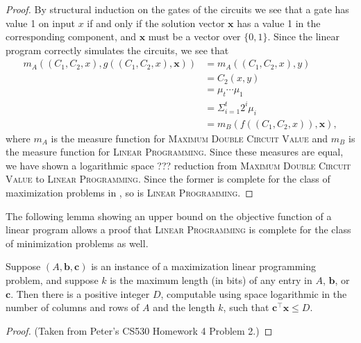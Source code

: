 \documentclass[]{article}
\begin{document}
\begin{proof}
  By structural induction on the gates of the circuits we see that a gate has value 1 on input $x$ if and only if the solution vector $\mathbf{x}$ has a value 1 in the corresponding component, and $\mathbf{x}$ must be a vector over $\{0, 1\}$.
  Since the linear program correctly simulates the circuits, we see that
  \begin{align*}
    m_A((C_1, C_2, x), g((C_1, C_2, x), \mathbf{x})) & = m_A((C_1, C_2, x), y) \\
    & = C_2(x, y) \\
    & = \mu_t \dotsb \mu_1 \\
    & = \Sigma^t_{i = 1} 2^i \mu_i \\
    & = m_B(f((C_1, C_2, x)), \mathbf{x}),
  \end{align*}
  where $m_A$ is the measure function for \textsc{Maximum Double Circuit Value} and $m_B$ is the measure function for \textsc{Linear Programming}.
  Since these measures are equal, we have shown a logarithmic space ??? reduction from \textsc{Maximum Double Circuit Value} to \textsc{Linear Programming}.
  Since the former is complete for the class of maximization problems in \PO, so is \textsc{Linear Programming}.
\end{proof}

The following lemma showing an upper bound on the objective function of a linear program allows a proof that \textsc{Linear Programming} is complete for the class of minimization problems as well.

\begin{lemma}\label{lem:upperbound}
  Suppose $(A, \mathbf{b}, \mathbf{c})$ is an instance of a maximization linear programming problem, and suppose $k$ is the maximum length (in bits) of any entry in $A$, $\mathbf{b}$, or $\mathbf{c}$.
  Then there is a positive integer $D$, computable using space logarithmic in the number of columns and rows of $A$ and the length $k$, such that $\mathbf{c}^\intercal \mathbf{x} \leq D$.
\end{lemma}
\begin{proof}
  (Taken from Peter's CS530 Homework 4 Problem 2.)
\end{proof}
\end{document}
